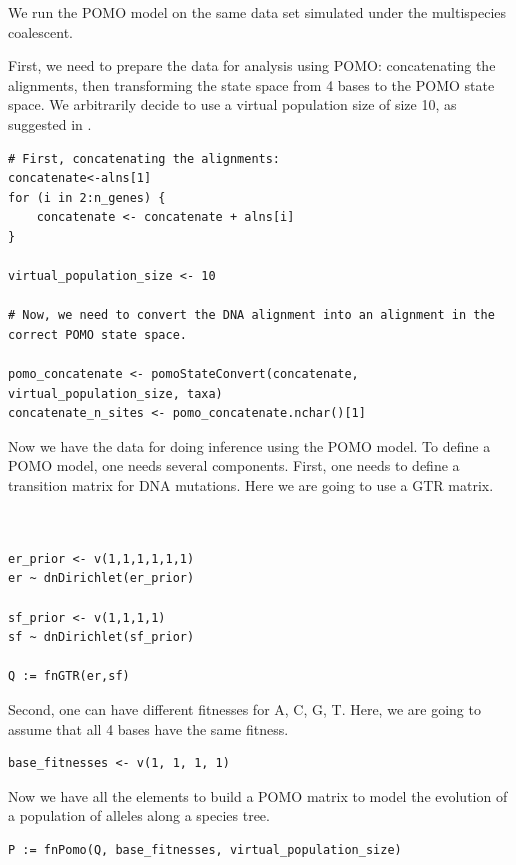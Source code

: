 \documentclass[11pt]{article}
\begin{document}
We run the POMO model on the same data set simulated under the multispecies coalescent.
 {\begin{framed}
 First, we need to prepare the data for analysis using POMO: concatenating the alignments, then transforming the state space from 4 bases to the POMO state space.
 We arbitrarily decide to use a virtual population size of size 10, as suggested in \citet{DeMaio2013}.
 {\tt \begin{snugshade*}
\begin{lstlisting}
# First, concatenating the alignments:
concatenate<-alns[1]
for (i in 2:n_genes) {
	concatenate <- concatenate + alns[i]
}

virtual_population_size <- 10

# Now, we need to convert the DNA alignment into an alignment in the correct POMO state space.

pomo_concatenate <- pomoStateConvert(concatenate, virtual_population_size, taxa)
concatenate_n_sites <- pomo_concatenate.nchar()[1]
\end{lstlisting}
\end{snugshade*}}
Now we have the data for doing inference using the POMO model.
To define a POMO model, one needs several components.
First, one needs to define a transition matrix for DNA mutations.
Here we are going to use a GTR matrix. 

 {\tt \begin{snugshade*}
\begin{lstlisting}


er_prior <- v(1,1,1,1,1,1)
er ~ dnDirichlet(er_prior)

sf_prior <- v(1,1,1,1)
sf ~ dnDirichlet(sf_prior)

Q := fnGTR(er,sf) 
\end{lstlisting}
\end{snugshade*}}

Second, one can have different fitnesses for A, C, G, T. 
Here, we are going to assume that all 4 bases have the same fitness.

 {\tt \begin{snugshade*}
\begin{lstlisting}
base_fitnesses <- v(1, 1, 1, 1)
\end{lstlisting}
\end{snugshade*}}
Now we have all the elements to build a POMO matrix to model the evolution of a population of alleles along a species tree.
 {\tt \begin{snugshade*}
\begin{lstlisting}
P := fnPomo(Q, base_fitnesses, virtual_population_size)
\end{lstlisting}
\end{snugshade*}}


\end{framed}}
\end{document}
